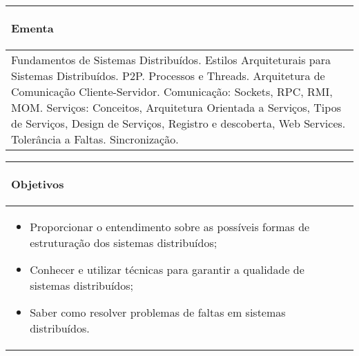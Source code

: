 \begin{table}[h!]
\centering

\begin{small} 
  
\setlength{\tabcolsep}{1pt} 
\begin{tabular}{|p{15cm}|}\hline

\begin{center}\textbf{Ementa}\end{center}\\ \hline
Fundamentos de Sistemas Distribuídos. Estilos Arquiteturais para Sistemas Distribuídos. P2P. Processos e Threads. Arquitetura de Comunicação Cliente-Servidor. Comunicação: Sockets, RPC, RMI, MOM. Serviços: Conceitos, Arquitetura Orientada a Serviços, Tipos de Serviços, Design de Serviços, Registro e descoberta, Web Services. Tolerância a Faltas. Sincronização. \\ \hline
\end{tabular} 
\end{small}
\label{dadosinstituicao}
\end{table} 

\hspace{1cm}
\begin{table}[h!]
\centering

\begin{small} 
  
\setlength{\tabcolsep}{3pt} 
\begin{tabular}{|p{15cm}|}\hline

\begin{center}\textbf{Objetivos}\end{center}\\ \hline
\begin{itemize}
\item Proporcionar o entendimento sobre as possíveis formas de estruturação dos sistemas distribuídos;
\item Conhecer e utilizar técnicas para garantir a qualidade de sistemas distribuídos;
\item Saber como resolver problemas de faltas em sistemas distribuídos.
\end{itemize}
 \\ \hline
\end{tabular} 
\end{small}
\label{dadosinstituicao}
\end{table}

